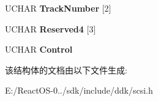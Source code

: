 \begin{DoxyCompactItemize}
\item 
\mbox{\label{struct___c_d_b_1_1___c_l_o_s_e___t_r_a_c_k_a3978166d39ef857cad31101747d55da2}} 
U\+C\+H\+AR {\bfseries Track\+Number} \mbox{[}2\mbox{]}
\item 
\mbox{\label{struct___c_d_b_1_1___c_l_o_s_e___t_r_a_c_k_a30a04dbe5cee37f0f766bd630ed1a594}} 
U\+C\+H\+AR {\bfseries Reserved4} \mbox{[}3\mbox{]}
\item 
\mbox{\label{struct___c_d_b_1_1___c_l_o_s_e___t_r_a_c_k_a68a3d67f5e4b6959cf5bf9136b58691e}} 
U\+C\+H\+AR {\bfseries Control}
\end{DoxyCompactItemize}


该结构体的文档由以下文件生成\+:\begin{DoxyCompactItemize}
\item 
E\+:/\+React\+O\+S-\/0../sdk/include/ddk/scsi.\+h\end{DoxyCompactItemize}

